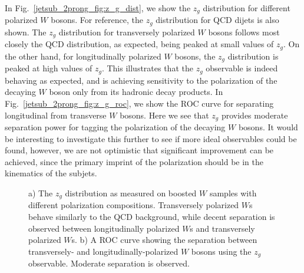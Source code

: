 \documentclass[11pt,letterpaper]{article}
\begin{document}
In Fig.~\ref{jetsub_2prong_fig:z_g_dist}, we show the $z_g$ distribution for different polarized $W$ bosons.
%
For reference, the $z_g$ distribution for QCD dijets is also shown.
%
The $z_g$ distribution for transversely polarized $W$ bosons follows most closely the QCD distribution, as expected, being peaked at small values of $z_g$.
%
On the other hand, for longitudinally polarized $W$ bosons, the $z_g$ distribution is peaked at high values of $z_g$.
%
This illustrates that the $z_g$ observable is indeed behaving as expected, and is achieving sensitivity to the polarization of the decaying $W$ boson only from its hadronic decay products.
%
In Fig.~\ref{jetsub_2prong_fig:z_g_roc}, we show  the ROC curve for separating longitudinal from transverse $W$ bosons.
%
Here we see that $z_g$ provides moderate separation power for tagging the polarization of the decaying $W$ bosons.
%
It would be interesting to investigate this further to see if more ideal observables could be found, however, we are not optimistic that significant improvement can be achieved, since the primary imprint of the polarization should be in the kinematics of the subjets.

\begin{figure}
\begin{center}
\end{center}
\caption{a) The $z_g$ distribution as measured on boosted $W$ samples with different polarization compositions. Transversely polarized $W$s behave similarly to the QCD background, while decent separation is observed between longitudinally polarized $W$s and transversely polarized $W$s. b) A ROC curve showing the separation between transversely- and longitudinally-polarized $W$ bosons using the $z_g$ observable. Moderate separation is observed.}
\end{figure}
\end{document}
